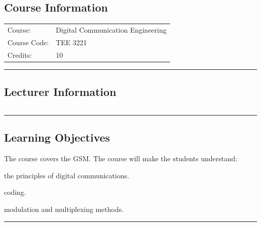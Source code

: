 
\subsection*{Course Information}
\vspace{0ex}%
\noindent\parbox{0.5\textwidth}{%
    \noindent\begin{tabular}{@{}ll}
                 \textsf{Course:}          & Digital Communication Engineering 	 \\
                 \textsf{Course Code:}         & 	TEE 3221    \\
                 \textsf{Credits:}    & 	10
    \end{tabular}}
\vspace{2ex}\hrule\vspace{2ex}

\subsection*{Lecturer Information}
\noindent\parbox{0.5\textwidth}{%
    \noindent\begin{tabular}{@{}ll}
                 
    \end{tabular}}
\vspace{2ex}\hrule\vspace{2ex}


\subsection*{Learning Objectives}
The course covers the GSM.
The course will make the students understand:
\begin{outline}
    \1 the principles of digital communications.

    \1 coding.

    \1 modulation and multiplexing methods.
\end{outline}
\vspace{2ex}\hrule\vspace{2ex}

